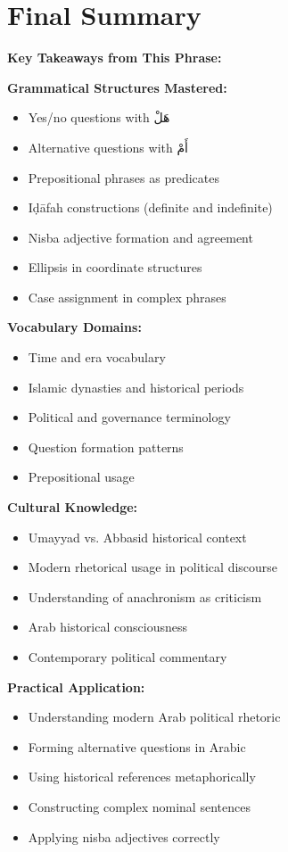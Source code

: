 \documentclass[letterpaper,12pt]{article}
\begin{document}
\section{Final Summary}
\noindent
\begin{tcolorbox}[colback=boxcolor,colframe=accentcolor,breakable]
\textbf{Key Takeaways from This Phrase:}

\textbf{Grammatical Structures Mastered:}
\begin{itemize}
\item Yes/no questions with \textarabic{هَلْ}
\item Alternative questions with \textarabic{أَمْ}
\item Prepositional phrases as predicates
\item Iḍāfah constructions (definite and indefinite)
\item Nisba adjective formation and agreement
\item Ellipsis in coordinate structures
\item Case assignment in complex phrases
\end{itemize}

\textbf{Vocabulary Domains:}
\begin{itemize}
\item Time and era vocabulary
\item Islamic dynasties and historical periods
\item Political and governance terminology
\item Question formation patterns
\item Prepositional usage
\end{itemize}

\textbf{Cultural Knowledge:}
\begin{itemize}
\item Umayyad vs. Abbasid historical context
\item Modern rhetorical usage in political discourse
\item Understanding of anachronism as criticism
\item Arab historical consciousness
\item Contemporary political commentary
\end{itemize}

\textbf{Practical Application:}
\begin{itemize}
\item Understanding modern Arab political rhetoric
\item Forming alternative questions in Arabic
\item Using historical references metaphorically
\item Constructing complex nominal sentences
\item Applying nisba adjectives correctly
\end{itemize}
\end{tcolorbox}
\end{document}
